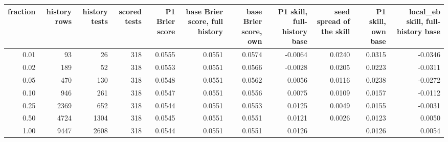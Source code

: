 \begin{tabular}{rrrrrrrrrrr}
\toprule
fraction & history rows & history tests & scored tests & P1 Brier score & base Brier score, full history & base Brier score, own & P1 skill, full-history base & seed spread of the skill & P1 skill, own base & local\_eb skill, full-history base \\
\midrule
0.01 & 93 & 26 & 318 & 0.0555 & 0.0551 & 0.0574 & -0.0064 & 0.0240 & 0.0315 & -0.0346 \\
0.02 & 189 & 52 & 318 & 0.0553 & 0.0551 & 0.0566 & -0.0028 & 0.0205 & 0.0223 & -0.0311 \\
0.05 & 470 & 130 & 318 & 0.0548 & 0.0551 & 0.0562 & 0.0056 & 0.0116 & 0.0238 & -0.0272 \\
0.10 & 946 & 261 & 318 & 0.0547 & 0.0551 & 0.0556 & 0.0075 & 0.0109 & 0.0157 & -0.0112 \\
0.25 & 2369 & 652 & 318 & 0.0544 & 0.0551 & 0.0553 & 0.0125 & 0.0049 & 0.0155 & -0.0031 \\
0.50 & 4724 & 1304 & 318 & 0.0545 & 0.0551 & 0.0551 & 0.0121 & 0.0026 & 0.0123 & 0.0050 \\
1.00 & 9447 & 2608 & 318 & 0.0544 & 0.0551 & 0.0551 & 0.0126 &  & 0.0126 & 0.0054 \\
\bottomrule
\end{tabular}
